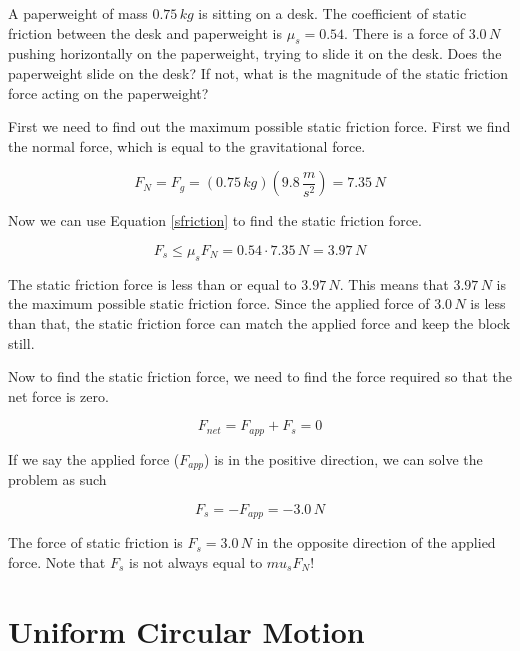 \documentclass[12pt]{book}
\begin{document}
\begin{exampleblock}

A paperweight of mass $0.75 \, kg$ is sitting on a desk. The coefficient of static friction between the desk and paperweight is $\mu_s = 0.54$. There is a force of $3.0 \, N$ pushing horizontally on the paperweight, trying to slide it on the desk. Does the paperweight slide on the desk? If not, what is the magnitude of the static friction force acting on the paperweight?

\hspace{10pt}

First we need to find out the maximum possible static friction force. First we find the normal force, which is equal to the gravitational force.

\begin{equation}
F_N = F_g = (0.75 \, kg) (9.8 \, \frac{m}{s^2}) = 7.35 \, N
\end{equation}

Now we can use Equation \ref{sfriction} to find the static friction force.

\begin{equation}
F_s \leq \mu_s F_N = 0.54 \cdot 7.35 \, N = 3.97 \, N
\end{equation}

The static friction force is less than or equal to $3.97 \, N$. This means that $3.97 \, N$ is the maximum possible static friction force. Since the applied force of $3.0 \, N$ is less than that, the static friction force can match the applied force and keep the block still.

Now to find the static friction force, we need to find the force required so that the net force is zero. 

\begin{equation}
F_{net} = F_{app} + F_s = 0
\end{equation}

If we say the applied force ($F_{app}$) is in the positive direction, we can solve the problem as such

\begin{equation}
F_s = -F_{app} = - 3.0 \, N
\end{equation}

The force of static friction is $F_s = 3.0 \, N$ in the opposite direction of the applied force. Note that $F_s$ is not always equal to $mu_s F_N$!

\end{exampleblock}

\section{Uniform Circular Motion}
\end{document}

